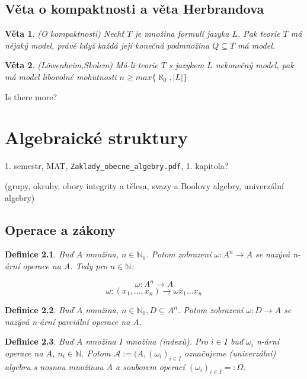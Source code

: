 \documentclass[a4paper, 11pt]{report}
\newtheorem{mydef}{Definice}[chapter]
\newtheorem{veta}{Věta}
\begin{document}
\section{Věta o kompaktnosti a věta Herbrandova}

\begin{veta}
(O kompaktnosti) Nechť $T$ je množina formulí jazyka $L$. Pak teorie $T$ má nějaký model, právě když každá její konečná podmnožina $Q \subseteq T$ má model.
\end{veta}

\begin{veta}
(Löwenheim,Skolem) Má-li teorie $T$ s jazykem $L$ nekonečný model, pak má model libovolné mohutnosti $n \geq max\{\aleph_0, |L|\}$
\end{veta}

Is there more?





\chapter{Algebraické struktury} \label{cha:8}

1. semestr, MAT, \texttt{Zaklady\_obecne\_algebry.pdf}, 1. kapitola?

(grupy, okruhy, obory integrity a tělesa, svazy a Boolovy algebry, univerzální algebry)

\section{Operace a zákony}

\begin{mydef}
Buď $A$ množina, $n \in \mathbb{N}_0$. Potom zobrazení $\omega : A^n \to A$ se nazývá n-ární operace na $A$. Tedy pro $n \in \mathbb{N}$:

$$ \omega : A^n \to A $$
$$ \omega : (x_1, \dots, x_n) \to \omega x_1 \dots x_n$$
\end{mydef}

\begin{mydef}
Buď $A$ množina, $n \in \mathbb{N}_0, D \subseteq A^n$. Potom zobrazení $\omega : D \to A$ se nazývá n-ární parciální operace na $A$.
\end{mydef}

\begin{mydef}
Buď $A$ množina $I$ množina (indexů). Pro $i \in I$ buď $\omega_i$ n-ární operace na $A$, $n_i \in \mathbb{N}$. Potom $\mathcal{A} := (A, (\omega_i)_{i \in I}$ označujeme (univerzální) algebru s nosnou množinou $A$ a souborem operací $(\omega_i)_{i \in I} =: \Omega$.
\end{mydef}
\end{document}

